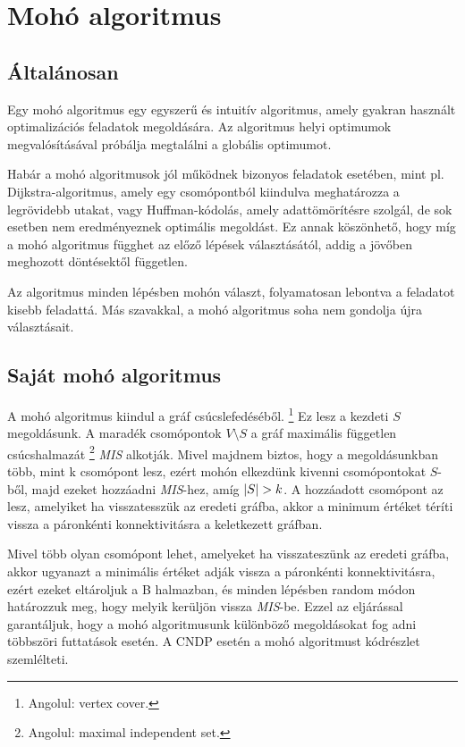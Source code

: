 \section{Mohó algoritmus}\label{sec:MOHO_ALGORITMUS}

\subsection{Általánosan}
Egy mohó algoritmus egy egyszerű és intuitív algoritmus, amely gyakran használt
optimalizációs feladatok megoldására. Az algoritmus helyi optimumok megvalósításával próbálja
megtalálni a globális optimumot.

Habár a mohó algoritmusok jól működnek bizonyos feladatok esetében,
mint pl. Dijkstra-algoritmus, amely egy csomópontból kiindulva meghatározza a legrövidebb utakat,
vagy Huffman-kódolás, amely adattömörítésre szolgál, de sok esetben nem eredményeznek optimális megoldást.
Ez annak köszönhető, hogy míg a mohó algoritmus függhet az előző lépések választásától,
addig a jövőben meghozott döntésektől független.

Az algoritmus minden lépésben mohón választ, folyamatosan lebontva a feladatot kisebb feladattá.
Más szavakkal, a mohó algoritmus soha nem gondolja újra választásait.

\subsection{Saját mohó algoritmus}
A mohó algoritmus kiindul a gráf csúcslefedéséből.
\footnote{
  Angolul: vertex cover.
}
Ez lesz a kezdeti $S$ megoldásunk.
A maradék csomópontok $V \setminus S$  a gráf maximális független csúcshalmazát
\footnote{
  Angolul: maximal independent set.
}
\emph{MIS} alkotják.
Mivel majdnem biztos, hogy a megoldásunkban több, mint k csomópont lesz, ezért mohón elkezdünk kivenni csomópontokat $S$-ből,
majd ezeket hozzáadni \emph{MIS}-hez, amíg $\lvert S\rvert > k$.
A hozzáadott csomópont az lesz, amelyiket ha visszatesszük az eredeti gráfba,
akkor a minimum értéket téríti vissza a páronkénti konnektivitásra a keletkezett gráfban.

Mivel több olyan csomópont lehet, amelyeket ha visszateszünk az eredeti gráfba,
akkor ugyanazt a minimális értéket adják vissza a páronkénti konnektivitásra,
ezért ezeket eltároljuk a B halmazban, és minden lépésben random módon határozzuk meg,
hogy melyik kerüljön vissza \emph{MIS}-be. Ezzel az eljárással garantáljuk,
hogy a mohó algoritmusunk különböző megoldásokat fog adni többszöri futtatások esetén.
A CNDP esetén a mohó algoritmust  kódrészlet szemlélteti.

